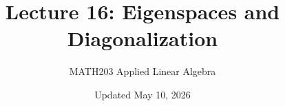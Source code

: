 \documentclass[10pt]{beamer}
\title{Lecture 16: Eigenspaces and Diagonalization}
\subtitle{MATH203 Applied Linear Algebra}
\date{Updated May 10, 2026}
\theoremstyle{definition}
\begin{document}
\begin{frame}[plain]
\vspace*{-14pt}
\titlepage
\end{frame}


\end{document}
